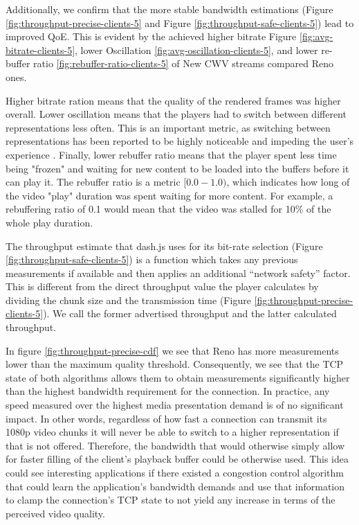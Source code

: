 \documentclass[10pt,sigconf]{acmart}
\begin{document}
Additionally, we confirm that the more stable bandwidth estimations (Figure \ref{fig:throughput-precise-clients-5} and Figure \ref{fig:throughput-safe-clients-5}) lead to improved QoE. This is evident by the achieved higher bitrate Figure \ref{fig:avg-bitrate-clients-5}, lower Oscillation \ref{fig:avg-oscillation-clients-5}, and lower re-buffer ratio \ref{fig:rebuffer-ratio-clients-5} of New CWV streams compared Reno ones.

Higher bitrate ration means that the quality of the rendered frames was higher overall. Lower oscillation means that the players had to switch between different representations less often. This is an important metric, as switching between representations has been reported to be highly noticeable and impeding the user's experience \cite{Spiteri-2016-BOLA,Akhshabi-2012-http-adaptive-players-compete,Huang-2013-downtown-abbey}. Finally, lower rebuffer ratio means that the player spent less time being "frozen" and waiting for new content to be loaded into the buffers before it can play it. The rebuffer ratio is a metric $[0.0 - 1.0)$, which indicates how long of the video "play" duration was spent waiting for more content. For example, a rebuffering ratio of 0.1 would mean that the video was stalled for 10\% of the whole play duration. 

The throughput estimate that dash.js uses for its bit-rate selection (Figure \ref{fig:throughput-safe-clients-5}) is a function which takes any previous measurements if available and then applies an additional ``network safety'' factor. This is different from the direct throughput value the player calculates by dividing the chunk size and the transmission time (Figure \ref{fig:throughput-precise-clients-5}). We call the former advertised throughput and the latter calculated throughput.

In figure \ref{fig:throughput-precise-cdf} we see that Reno has more measurements lower than the maximum quality threshold. Consequently, we see that the TCP state of both algorithms allows them to obtain measurements significantly higher than the highest bandwidth requirement for the connection. In practice, any speed measured over the highest media presentation demand is of no significant impact. In other words, regardless of how fast a connection can transmit its 1080p video chunks it will never be able to switch to a higher representation if that is not offered. Therefore, the bandwidth that would otherwise simply allow for faster filling of the client's playback buffer could be otherwise used. This idea could see interesting applications if there existed a congestion control algorithm that could learn the application's bandwidth demands and use that information to clamp the connection's TCP state to not yield any increase in terms of the perceived video quality.   
\end{document}
